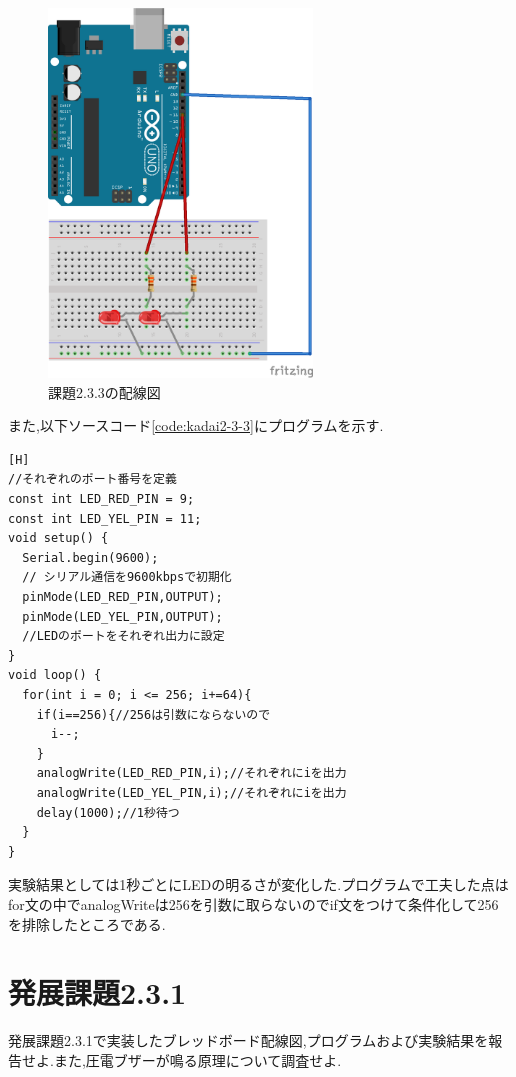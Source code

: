 \documentclass{jarticle}
\begin{document}
\begin{figure}[H]
\begin{center}
\includegraphics[width=7.0cm]{images/enshu2-3-4_bread.png}
\caption{課題2.3.3の配線図}
\label{fig:kadai2-3-3bread}
\end{center}
\end{figure}

また,以下ソースコード\ref{code:kadai2-3-3}にプログラムを示す.

\begin{lstlisting}[caption = 課題2.3.3,label=code:kadai2-3-3][H]
//それぞれのポート番号を定義
const int LED_RED_PIN = 9;
const int LED_YEL_PIN = 11;
void setup() {
  Serial.begin(9600);
  // シリアル通信を9600kbpsで初期化
  pinMode(LED_RED_PIN,OUTPUT);
  pinMode(LED_YEL_PIN,OUTPUT);
  //LEDのポートをそれぞれ出力に設定
}
void loop() {
  for(int i = 0; i <= 256; i+=64){
    if(i==256){//256は引数にならないので
      i--;
    }
    analogWrite(LED_RED_PIN,i);//それぞれにiを出力
    analogWrite(LED_YEL_PIN,i);//それぞれにiを出力
    delay(1000);//1秒待つ
  }
}
\end{lstlisting}

実験結果としては1秒ごとにLEDの明るさが変化した.プログラムで工夫した点はfor文の中でanalogWriteは256を引数に取らないのでif文をつけて条件化して256を排除したところである.

\section{発展課題2.3.1}

発展課題2.3.1で実装したブレッドボード配線図,プログラムおよび実験結果を報告せよ.また,圧電ブザーが鳴る原理について調査せよ.
\end{document}
